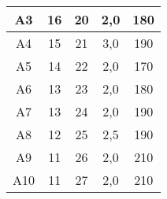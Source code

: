 \begin{table}[hbt!]
\begin{tabular}{@{}ccccc@{}}
		A3   & 16                                                                                      & 20                                                                                    & 2,0                                                                         & 180                                                                   \\ \midrule
		A4   & 15                                                                                      & 21                                                                                    & 3,0                                                                         & 190                                                                   \\ \midrule
		A5   & 14                                                                                      & 22                                                                                    & 2,0                                                                         & 170                                                                   \\ \midrule
		A6   & 13                                                                                      & 23                                                                                    & 2,0                                                                         & 180                                                                   \\ \midrule
		A7   & 13                                                                                      & 24                                                                                    & 2,0                                                                         & 190                                                                   \\ \midrule
		A8   & 12                                                                                      & 25                                                                                    & 2,5                                                                         & 190                                                                   \\ \midrule
		A9   & 11                                                                                      & 26                                                                                    & 2,0                                                                         & 210                                                                   \\ \midrule
		A10  & 11                                                                                      & 27                                                                                    & 2,0                                                                         & 210                                                                   \\ \bottomrule
	\end{tabular}
	\label{tab:hslm_a_parameters}
\end{table}

